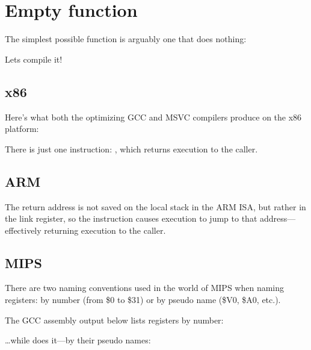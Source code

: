 \section{Empty function}

The simplest possible function is arguably one that does nothing:



Lets compile it!

\subsection{x86}

Here's what both the optimizing GCC and MSVC compilers produce on the x86 platform:



There is just one instruction: \RET, which returns execution to the \gls{caller}.

\subsection{ARM}



The return address is not saved on the local stack in the ARM \ac{ISA}, but rather in the link register, 
so the  instruction causes execution to jump to that address---effectively returning execution
to the \gls{caller}.

\subsection{MIPS}

There are two naming conventions used in the world of MIPS when naming registers:
by number (from \$0 to \$31) or by pseudo name (\$V0, \$A0, etc.).

The GCC assembly output below lists registers by number:



\dots while \IDA does it---by their pseudo names:



